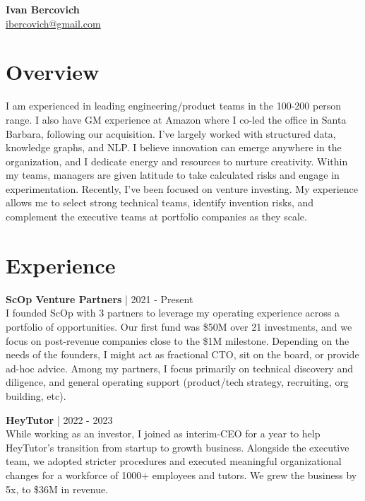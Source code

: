 \documentclass[a4paper,10pt]{article}
\begin{document}
\noindent
\textbf{\Large Ivan Bercovich} \\
\href{mailto:ibercovich@gmail.com}{ibercovich@gmail.com} \\
\vspace{0cm}

\section*{Overview}
\noindent
I am experienced in leading engineering/product teams in the 100-200 person range. I also have GM experience at Amazon where I co-led the office in Santa Barbara, following our acquisition. I've largely worked with structured data, knowledge graphs, and NLP. I believe innovation can emerge anywhere in the organization, and I dedicate energy and resources to nurture creativity. Within my teams, managers are given latitude to take calculated risks and engage in experimentation. Recently, I’ve been focused on venture investing. My experience allows me to select strong technical teams, identify invention risks, and complement the executive teams at portfolio companies as they scale.

\section*{Experience}

\noindent
\textbf{ScOp Venture Partners} | 2021 - Present \\
I founded ScOp with 3 partners to leverage my operating experience across a portfolio of opportunities. Our first fund was \$50M over 21 investments, and we focus on post-revenue companies close to the \$1M milestone. Depending on the needs of the founders, I might act as fractional CTO, sit on the board, or provide ad-hoc advice. Among my partners, I focus primarily on technical discovery and diligence, and general operating support (product/tech strategy, recruiting, org building, etc).

\vspace{5pt} %

\noindent
\textbf{HeyTutor} | 2022 - 2023 \\
While working as an investor, I joined as interim-CEO for a year to help HeyTutor's transition from startup to growth business. Alongside the executive team, we adopted stricter procedures and executed meaningful organizational changes for a workforce of 1000+ employees and tutors. We grew the business by 5x, to \$36M in revenue.
\end{document}
